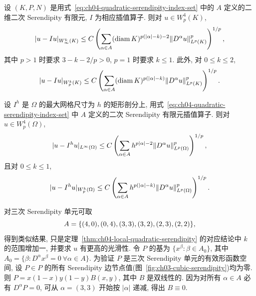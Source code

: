 \setcounter{thmcount}{17}
\begin{Theorem}
\label{thm:ch04-local-quadratic-serendipity}
设 $(K,P,N)$ 是用式~\eqref{eq:ch04-quadratic-serendipity-index-set} 中的 $A$ 定义的二维二次 Serendipity 有限元, $I$ 为相应插值算子. 则对 $u\in W_p^4(K)$,
\[
\MathBookFormulaID{formula-ch04-local-quadratic-serendipity-linfty}
|u-Iu|_{W_\infty^k(K)}
\leq C\left(\sum_{\alpha\in A}(\operatorname{diam}K)^{p(|\alpha|-k)-2}
\|D^\alpha u\|_{L^p(K)}^p\right)^{1/p},
\]
其中 $p>1$ 时要求 $3-k-2/p>0$, $p=1$ 时要求 $k\leq1$. 此外, 对 $0\leq k\leq2$,
\[
\MathBookFormulaID{formula-ch04-local-quadratic-serendipity-lp}
|u-Iu|_{W_p^k(K)}
\leq C\left(\sum_{\alpha\in A}(\operatorname{diam}K)^{p(|\alpha|-k)}
\|D^\alpha u\|_{L^p(K)}^p\right)^{1/p}.
\]
\end{Theorem}

\setcounter{thmcount}{18}
\begin{Theorem}
\label{thm:ch04-global-quadratic-serendipity}
设 $I^h$ 是 $\Omega$ 的最大网格尺寸为 $h$ 的矩形剖分上, 用式~\eqref{eq:ch04-quadratic-serendipity-index-set} 中 $A$ 定义的二次 Serendipity 有限元插值算子. 则对 $u\in W_p^4(\Omega)$,
\[
\MathBookFormulaID{formula-ch04-global-quadratic-serendipity-linfty}
|u-I^h u|_{L^\infty(\Omega)}
\leq C\left(\sum_{\alpha\in A}h^{p|\alpha|-2}\|D^\alpha u\|_{L^p(\Omega)}^p\right)^{1/p},
\]
且对 $0\leq k\leq1$,
\[
\MathBookFormulaID{formula-ch04-global-quadratic-serendipity-lp}
|u-I^h u|_{W_p^k(\Omega)}
\leq C\left(\sum_{\alpha\in A}h^{p(|\alpha|-k)}\|D^\alpha u\|_{L^p(\Omega)}^p\right)^{1/p}.
\]
\end{Theorem}

对三次 Serendipity 单元可取
\begin{equation}
\MathBookFormulaID{formula-ch04-cubic-serendipity-index-set}
\label{eq:ch04-cubic-serendipity-index-set}
A=\{(4,0),(0,4),(3,3),(3,2),(2,3),(2,2)\},
\end{equation}
得到类似结果, 只是定理~\ref{thm:ch04-local-quadratic-serendipity} 的对应结论中 $k$ 的范围增加一, 并要求 $u$ 有更高的光滑性. 令 $P$ 的基为 $\{x^\beta:\beta\in A_0\}$, 其中 $A_0=\{\beta:D^\alpha x^\beta=0\ \forall\alpha\in A\}$. 为验证 $P$ 是三次 Serendipity 单元的有效形函数空间, 设 $P\in P$ 的所有 Serendipity 边节点值(图~\ref{fig:ch03-cubic-serendipity})均为零. 则 $P=x(1-x)y(1-y)B(x,y)$, 其中 $B$ 是双线性的. 因为对所有 $\alpha\in A$ 必有 $D^\alpha P=0$, 可从 $\alpha=(3,3)$ 开始按 $|\alpha|$ 递减, 得出 $B\equiv0$.

